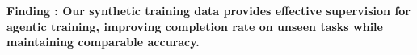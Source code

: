 \begin{shaded}
\noindent \textbf{Finding \findingnum: 
Our synthetic training data provides effective supervision for agentic training, improving completion rate on unseen tasks while maintaining comparable accuracy.
}
\end{shaded}